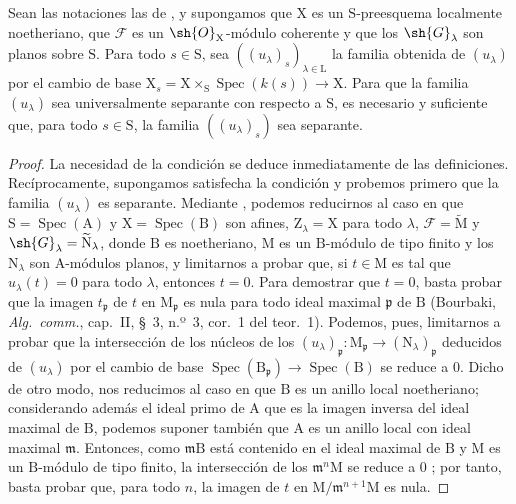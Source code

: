 \begin{theorem}[11.9.16]
\label{IV.11.9.16}
Sean las notaciones las de , y supongamos que $\mathrm{X}$ es un $\mathrm{S}$-preesquema localmente noetheriano, que $\mathscr{F}$ es un $\sh{O}_\mathrm{X}$-módulo coherente y que los $\sh{G}_\lambda$ son planos sobre $\mathrm{S}$.
Para todo $s\in\mathrm{S}$, sea $((u_\lambda)_s)_{\lambda\in\mathrm{L}}$ la familia obtenida de $(u_\lambda)$ por el cambio de base $\mathrm{X}_s=\mathrm{X}\times_\mathrm{S}\operatorname{Spec}(k(s))\to\mathrm{X}$.
Para que la familia $(u_\lambda)$ sea universalmente separante con respecto a $\mathrm{S}$, es necesario y suficiente que, para todo $s\in\mathrm{S}$, la familia $((u_\lambda)_s)$ sea separante.
\end{theorem}

\begin{proof}
La necesidad de la condición se deduce inmediatamente de las definiciones.
Recíprocamente, supongamos satisfecha la condición y probemos primero que la familia $(u_\lambda)$ es separante.
Mediante , podemos reducirnos al caso en que $\mathrm{S}=\operatorname{Spec}(\mathrm{A})$ y $\mathrm{X}=\operatorname{Spec}(\mathrm{B})$ son afines, $\mathrm{Z}_\lambda=\mathrm{X}$ para todo $\lambda$, $\mathscr{F}=\widetilde{\mathrm{M}}$ y $\sh{G}_\lambda=\widetilde{\mathrm{N}}_\lambda$, donde $\mathrm{B}$ es noetheriano, $\mathrm{M}$ es un $\mathrm{B}$-módulo de tipo finito y los $\mathrm{N}_\lambda$ son $\mathrm{A}$-módulos planos, y limitarnos a probar que, si $t\in\mathrm{M}$ es tal que $u_\lambda(t)=0$ para todo $\lambda$, entonces $t=0$.
Para demostrar que $t=0$, basta probar que la imagen $t_\mathfrak{p}$ de $t$ en $\mathrm{M}_\mathfrak{p}$ es nula para todo ideal maximal $\mathfrak{p}$ de $\mathrm{B}$ (Bourbaki, \emph{Alg.\ comm.}, cap.~II, \S~3, n.º~3, cor.~1 del teor.~1).
Podemos, pues, limitarnos a probar que la intersección
de los núcleos de los $(u_\lambda)_\mathfrak{p}:\mathrm{M}_\mathfrak{p}\to(\mathrm{N}_\lambda)_\mathfrak{p}$ deducidos de $(u_\lambda)$ por el cambio de base $\operatorname{Spec}(\mathrm{B}_\mathfrak{p})\to\operatorname{Spec}(\mathrm{B})$ se reduce a $0$.
Dicho de otro modo, nos reducimos al caso en que $\mathrm{B}$ es un anillo local noetheriano; considerando además el ideal primo de $\mathrm{A}$ que es la imagen inversa del ideal maximal de $\mathrm{B}$, podemos suponer también que $\mathrm{A}$ es un anillo local con ideal maximal $\mathfrak{m}$.
Entonces, como $\mathfrak{m}\mathrm{B}$ está contenido en el ideal maximal de $\mathrm{B}$ y $\mathrm{M}$ es un $\mathrm{B}$-módulo de tipo finito, la intersección de los $\mathfrak{m}^{n}\mathrm{M}$ se reduce a $0$ ; por tanto, basta probar que, para todo $n$, la imagen de $t$ en $\mathrm{M}/\mathfrak{m}^{n+1}\mathrm{M}$ es nula.

\end{proof}
